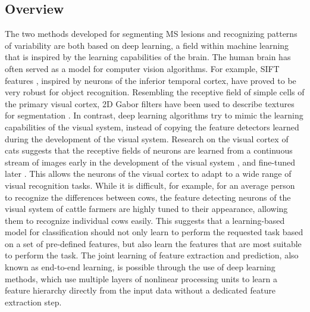 \subsection{Overview}

The two methods developed for segmenting MS lesions and recognizing patterns of
variability are both based on deep learning, a field within machine learning
that is inspired by the learning capabilities of the brain. The human brain has
often served as a model for computer vision algorithms.
For example, SIFT features \citep{lowe1999}, inspired by neurons of the inferior
temporal cortex, have proved to be very robust for object recognition.
Resembling the receptive field of simple cells of the primary visual cortex, 2D
Gabor filters have been used to describe textures for segmentation
\citep{grigorescu2002}. In contrast, deep learning algorithms try to mimic the
learning capabilities of the visual system, instead of copying the feature
detectors learned during the development of the visual system. Research on the
visual cortex of cats suggests that the receptive fields of neurons are learned
from a continuous stream of images early in the development of the visual system
\citep{wiesel1963}, and fine-tuned later \citep{karni1991}.
This allows the neurons of the visual cortex to adapt to a wide range of visual
recognition tasks. While it is difficult, for example, for an average person to
recognize the differences between cows, the feature detecting neurons of the
visual system of cattle farmers are highly tuned to their appearance, allowing
them to recognize individual cows easily. This suggests that a learning-based
model for classification should not only learn to perform the requested task
based on a set of pre-defined features, but also learn the features that are
most suitable to perform the task. The joint learning of feature extraction and
prediction, also known as end-to-end learning, is possible through the use of
deep learning methods, which use multiple layers of nonlinear processing units
to learn a feature hierarchy directly from the input data without a dedicated
feature extraction step.

